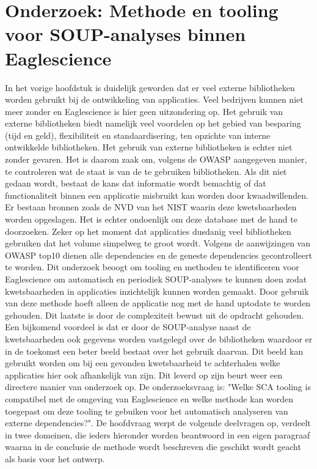 \chapter{Onderzoek: Methode en tooling voor SOUP-analyses binnen Eaglescience}\label{ch:onderzoek-tool-methode}
In het vorige hoofdstuk is duidelijk geworden dat er veel externe bibliotheken worden gebruikt bij de ontwikkeling van applicaties. Veel bedrijven kunnen niet meer zonder en Eaglescience is hier geen uitzondering op. Het gebruik van externe bibliotheken biedt namelijk veel voordelen op het gebied van besparing (tijd en geld), flexibiliteit en standaardisering, ten opzichte van interne ontwikkelde bibliotheken. Het gebruik van externe bibliotheken is echter niet zonder gevaren. Het is daarom zaak om, volgens de OWASP aangegeven manier, te controleren wat de staat is van de te gebruiken bibliotheken. Als dit niet gedaan wordt, bestaat de kans dat informatie wordt bemachtig of dat functionaliteit binnen een applicatie misbruikt kan worden door kwaadwillenden. Er bestaan bronnen zoals de NVD van het NIST waarin deze kwetsbaarheden worden opgeslagen. Het is echter ondoenlijk om deze database met de hand te doorzoeken. Zeker op het moment dat applicaties dusdanig veel bibliotheken gebruiken dat het volume simpelweg te groot wordt. Volgens de aanwijzingen van OWASP top10 dienen alle dependencies en de geneste dependencies gecontrolleert te worden.
Dit onderzoek beoogt om tooling en methoden te identificeren voor Eaglescience om automatisch en periodiek SOUP-analyses te kunnen doen zodat kwetsbaarheden in applicaties inzichtelijk kunnen worden gemaakt. Door gebruik van deze methode hoeft alleen de applicatie nog met de hand up\-to\-date te worden gehouden. Dit laatste is door de complexiteit bewust uit de opdracht gehouden. Een bijkomend voordeel is dat er door de SOUP-analyse naast de kwetsbaarheden ook gegevens worden vastgelegd over de bibliotheken waardoor er in de toekomst een beter beeld bestaat over het gebruik daarvan. Dit beeld kan gebruikt worden om bij een gevonden kwetsbaarheid te achterhalen welke applicaties hier ook afhankelijk van zijn. Dit leverd op zijn beurt weer een directere manier van onderzoek op.
De onderzoeksvraag is: "Welke SCA tooling is compatibel met de omgeving van Eaglescience en welke methode kan worden toegepast om deze tooling te gebuiken voor het automatisch analyseren van externe dependencies?". De hoofdvraag werpt de volgende deelvragen op, verdeelt in twee domeinen, die ieders hieronder worden beantwoord in een eigen paragraaf waarna in de conclusie de methode wordt beschreven die geschikt wordt geacht als basis voor het ontwerp.
